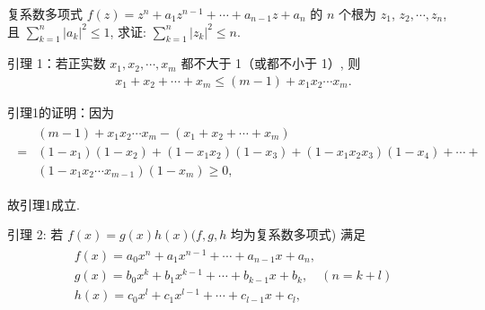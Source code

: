\begin{example}
	复系数多项式 $f(z)=z^n+a_1 z^{n-1}+\cdots+a_{n-1} z+a_n$ 的 $n$ 个根为 $z_1$, $z_2, \cdots, z_n$, 且 $\sum_{k=1}^n\left|a_k\right|^2 \leqslant 1$, 求证: $\sum_{k=1}^n\left|z_k\right|^2 \leqslant n$.
\end{example}
\begin{solution}
	引理 1：若正实数 $x_1, x_2, \cdots, x_m$ 都不大于 1（或都不小于 1）, 则
	\begin{align*}
		x_1+x_2+\cdots+x_m \leqslant(m-1)+x_1 x_2 \cdots x_m .
	\end{align*}

	引理1的证明：因为
	\begin{align*}
		\begin{aligned}
			  & (m-1)+x_1 x_2 \cdots x_m-\left(x_1+x_2+\cdots+x_m\right)                                                                           \\
			= & \left(1-x_1\right)\left(1-x_2\right)+\left(1-x_1 x_2\right)\left(1-x_3\right)+\left(1-x_1 x_2 x_3\right)\left(1-x_4\right)+\cdots+ \\
			  & \left(1-x_1 x_2 \cdots x_{m-1}\right)\left(1-x_m\right) \geqslant 0,
		\end{aligned}
	\end{align*}

	故引理1成立.


	引理 2: 若 $f(x)=g(x) h(x)(f, g, h$ 均为复系数多项式) 满足
	\begin{align*}
		\begin{gathered}
			f(x)=a_0 x^n+a_1 x^{n-1}+\cdots+a_{n-1} x+a_n, \\
			g(x)=b_0 x^k+b_1 x^{k-1}+\cdots+b_{k-1} x+b_k, \quad(n=k+l) \\
			h(x)=c_0 x^l+c_1 x^{l-1}+\cdots+c_{l-1} x+c_l,
		\end{gathered}
	\end{align*}


\end{solution}

